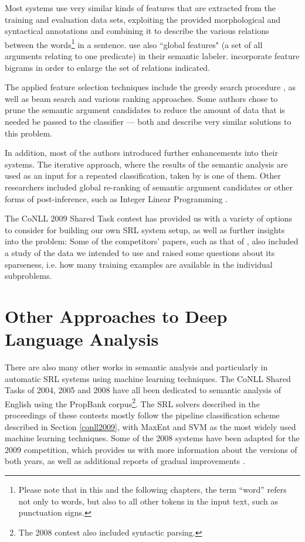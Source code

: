 \documentclass[12pt,notitlepage]{report}
\begin{document}
Most systems use very similar kinds of features that are extracted from the training and evaluation data sets, exploiting the provided morphological and syntactical annotations and combining it to describe the various relations between the words\footnote{Please note that in this and the following chapters, the term ``word'' refers not only to words, but also to all other tokens in the input text, such as punctuation signs.} in a sentence. \citet{asahara09} use also ``global features" (a set of all arguments relating to one predicate) in their semantic labeler. \citet{nugues09} incorporate feature bigrams in order to enlarge the set of relations indicated. 

The applied feature selection techniques include the greedy search procedure \citep[among others]{nugues09,zeman09}, as well as beam search \citep[][and others]{merlo09,nugues09} and various ranking approaches. Some authors chose to prune the semantic argument candidates to reduce the amount of data that is needed be passed to the classifier --- both \citet{zhao09} and \citet{asahara09} describe very similar solutions to this problem.

In addition, most of the authors introduced further enhancements into their systems. The iterative approach, where the results of the semantic analysis are used as an input for a repeated classification, taken by \citet{chen09} is one of them. Other researchers included global re-ranking of semantic argument candidates \citep{nugues09} or other forms of post-inference, such as Integer Linear Programming \citep{che09}.

The CoNLL 2009 Shared Task contest has provided us with a variety of options to consider for building our own SRL system setup, as well as further insights into the problem: Some of the competitors' papers, such as that of \citet{zeman09}, also included a study of the data we intended to use and raised some questions about its sparseness, i.e. how many training examples are available in the individual subproblems.

\section{Other Approaches to Deep Language Analysis}\label{related-other}

There are also many other works in semantic analysis and particularly in automatic SRL systems using machine learning techniques. The CoNLL Shared Tasks of 2004, 2005 \citep{carreras04,carreras05} and 2008 \citep{surdeanu08} have all been dedicated to semantic analysis of English using the PropBank corpus\footnote{The 2008 contest also included syntactic parsing.}. The SRL solvers described in the proceedings of these contests mostly follow the pipeline classification scheme described in Section \ref{conll2009}, with MaxEnt and SVM as the most widely used machine learning techniques. Some of the 2008 systems have been adapted for the 2009 competition, which provides us with more information about the versions of both years, as well as additional reports of gradual improvements \citep{che08,chen08}.
\end{document}
